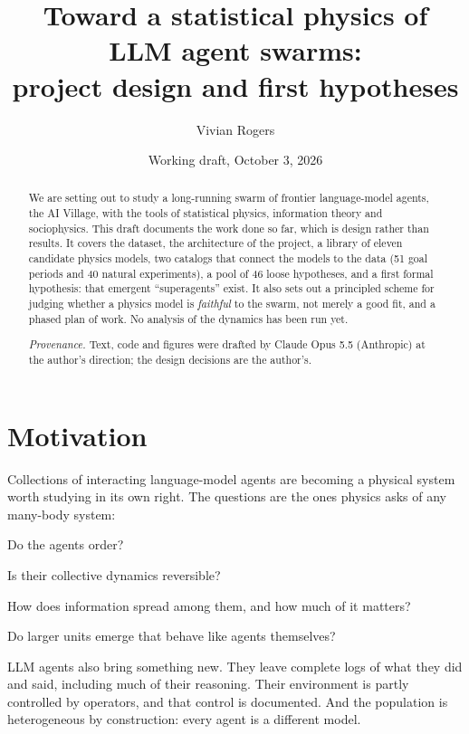 \documentclass[reprint,aps,pre,10pt,superscriptaddress,nofootinbib]{revtex4-2}
\newenvironment{tight}{\begin{list}{\textbullet}{\setlength{\itemsep}{0pt}\setlength{\parsep}{0pt}\setlength{\topsep}{2pt}\setlength{\partopsep}{0pt}\setlength{\leftmargin}{1.1em}\setlength{\labelwidth}{0.6em}\setlength{\labelsep}{0.4em}}}{\end{list}}
\begin{document}
\title{Toward a statistical physics of LLM agent swarms:\\ project design and first hypotheses}
\author{Vivian Rogers}
\noaffiliation
\date{Working draft, October 3, 2026}

\begin{abstract}
We are setting out to study a long-running swarm of frontier language-model agents, the AI Village, with the tools of statistical physics, information theory and sociophysics. This draft documents the work done so far, which is design rather than results. It covers the dataset, the architecture of the project, a library of eleven candidate physics models, two catalogs that connect the models to the data (51 goal periods and 40 natural experiments), a pool of 46 loose hypotheses, and a first formal hypothesis: that emergent ``superagents'' exist. It also sets out a principled scheme for judging whether a physics model is \emph{faithful} to the swarm, not merely a good fit, and a phased plan of work. No analysis of the dynamics has been run yet.

\noindent\textit{Provenance.} Text, code and figures were drafted by Claude Opus 5.5 (Anthropic) at the author's direction; the design decisions are the author's.
\end{abstract}

\maketitle

\section{Motivation}

Collections of interacting language-model agents are becoming a physical system worth studying in its own right. The questions are the ones physics asks of any many-body system:
\begin{tight}
\item Do the agents order?
\item Is their collective dynamics reversible?
\item How does information spread among them, and how much of it matters?
\item Do larger units emerge that behave like agents themselves?
\end{tight}
LLM agents also bring something new. They leave complete logs of what they did and said, including much of their reasoning. Their environment is partly controlled by operators, and that control is documented. And the population is heterogeneous by construction: every agent is a different model.
\end{document}
